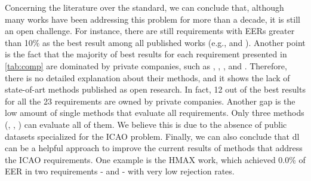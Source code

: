 Concerning the literature over the \icao standard, we can conclude that, although many works have been addressing this problem for more than a decade, it is still an open challenge. For instance, there are still requirements with EERs greater than 10\% as the best result among all published works (e.g., \lookingaway and \hairacrosseyes). Another point is the fact that the majority of best results for each requirement presented in \autoref{tab:comp} are dominated by private companies, such as \cite{biometrika}, \cite{id3}, \cite{seamfix}, and \cite{vsoft}. Therefore, there is no detailed explanation about their methods, and it shows the lack of state-of-art methods published as open research. In fact, 12 out of the best results for all the 23 requirements are owned by private companies. Another gap is the low amount of single methods that evaluate all requirements. Only three methods (\biolab, \biotest, \biopass) can evaluate all of them. We believe this is due to the absence of public datasets specialized for the ICAO problem. Finally, we can also conclude that \acl{dl} can be a helpful approach to improve the current results of methods that address the ICAO requirements. One example is the HMAX work, which achieved 0.0\% of EER in two requirements - \framestooheavy and \framecoveringeyes - with very low rejection rates.
